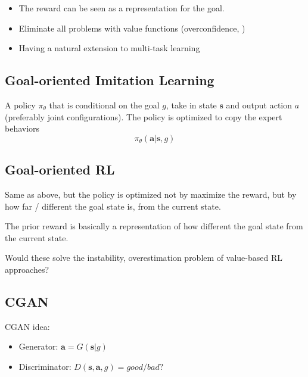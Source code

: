 \note
\begin{itemize}
	\item The reward can be seen as a representation for the goal.
	\item Eliminate all problems with value functions (overconfidence, \etc)
	\item Having a natural extension to multi-task learning
\end{itemize}

\subsection{Goal-oriented Imitation Learning}
A policy $\pi_\theta$ that is conditional on the goal $g$, take in state $\textbf{s}$ and output action $a$ (preferably joint configurations). The policy is optimized to copy the expert behaviors
\begin{equation}
	\pi_\theta(\textbf{a} | \textbf{s}, g)
\end{equation}

\subsection{Goal-oriented RL}
Same as above, but the policy is optimized not by maximize the reward, but by how far / different the goal state is, from the current state.

The prior reward is basically a representation of how different the goal state from the current state.

Would these solve the instability, overestimation problem of value-based \ac{RL} approaches?

\subsection{CGAN}
\ac{CGAN} idea:
\begin{itemize}
	\item Generator: $\textbf{a} = G(\textbf{s} | g)$
	\item Discriminator: $D(\textbf{s}, \textbf{a}, g) = good/bad?$
\end{itemize}

